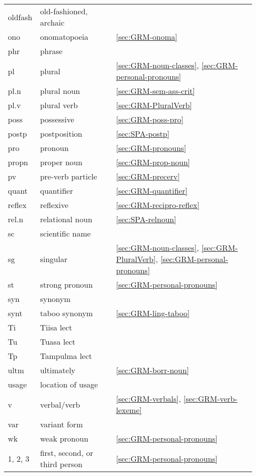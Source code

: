  \begin{tabular}{lll}

oldfash & old-fashioned, archaic &\\
ono   &   onomatopoeia   & \ref{sec:GRM-onoma}\\
phr   &    phrase   &    \\
pl    &   plural   & \ref{sec:GRM-noun-classes}, \ref{sec:GRM-personal-pronouns}\\
pl.n    &   plural  noun & \ref{sec:GRM-sem-ass-crit}\\
pl.v    &   plural  verb & \ref{sec:GRM-PluralVerb}\\
poss    &    possessive   &\ref{secːGRM-poss-pro}\\
postp   &   postposition  &\ref{sec:SPA-postp}\\
pro    &    pronoun &\ref{sec:GRM-pronouns}\\
propn   &   proper noun &\ref{sec:GRM-prop-noun}\\
pv    &    pre-verb particle &\ref{sec:GRM-precerv}\\
quant   &   quantifier &\ref{sec:GRM-quantifier}\\
 reflex   &   reflexive   &\ref{sec:GRM-recipro-reflex}\\ 
rel.n   &    relational noun &\ref{sec:SPA-relnoun}\\
sc& scientific name & \\
  sg   &   singular & \ref{sec:GRM-noun-classes}, \ref{sec:GRM-PluralVerb}, 
\ref{sec:GRM-personal-pronouns}\\
 st   &   strong pronoun &\ref{sec:GRM-personal-pronouns}\\
 syn  &     synonym &\\
synt   &     taboo synonym &\ref{sec:GRM-ling-taboo}\\
Ti &Tiisa lect & \\
Tu &Tuasa lect & \\
Tp &Tampulma lect & \\
 ultm    &    ultimately &\ref{sec:GRM-borr-noun}\\
usage   &    location of usage & \\
    v   &   verbal/verb & \ref{sec:GRM-verbals}, \ref{sec:GRM-verb-lexeme}\\
var    &    variant form & \\
 wk   &   weak pronoun &\ref{sec:GRM-personal-pronouns}\\
   1, 2, 3  &    first, second, or third person 
&\ref{sec:GRM-personal-pronouns}\\

 \end{tabular}

